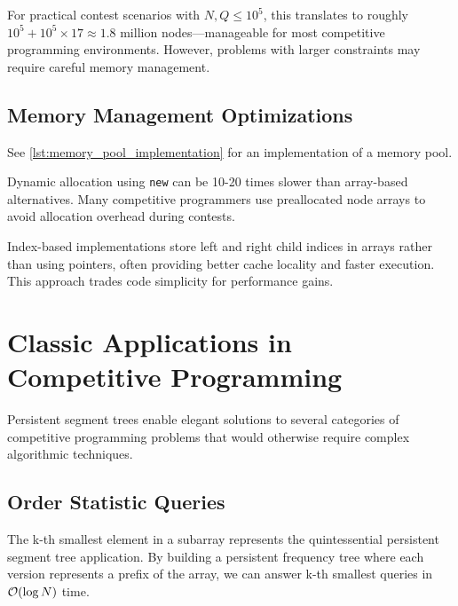 For practical contest scenarios with $N, Q \leq 10^5$, this translates to roughly $10^5 + 10^5 \times 17 \approx 1.8$ million nodes—manageable for most competitive programming environments. However, problems with larger constraints may require careful memory management.

\subsection{Memory Management Optimizations}
\begin{marginnoteenv}[0pt]{See \ref{lst:memory_pool_implementation} for an implementation of a memory pool.} \end{marginnoteenv}

Dynamic allocation using \texttt{new} can be 10-20 times slower than array-based alternatives. Many competitive programmers use preallocated node arrays to avoid allocation overhead during contests.

Index-based implementations store left and right child indices in arrays rather than using pointers, often providing better cache locality and faster execution. This approach trades code simplicity for performance gains.

\section{Classic Applications in Competitive Programming}
\label{sec:classic_applications}

Persistent segment trees enable elegant solutions to several categories of competitive programming problems that would otherwise require complex algorithmic techniques.

\subsection{Order Statistic Queries}
The k-th smallest element in a subarray represents the quintessential persistent segment tree application. By building a persistent frequency tree where each version represents a prefix of the array, we can answer k-th smallest queries in $\mathcal{O}(\log N)$ time.

